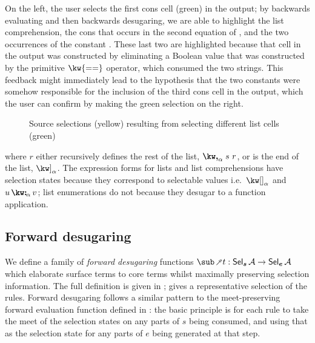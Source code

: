 On the left, the user selects the first cons cell (green) in the output; by backwards evaluating and then backwards desugaring, we are able to highlight the list comprehension, the cons that occurs in the second equation of , and the two occurrences of the constant . These last two are highlighted because that cell in the output was constructed by eliminating a Boolean value that was constructed by the primitive $\kw{==}$ operator, which consumed the two strings. This feedback might immediately lead to the hypothesis that the two constants  were somehow responsible for the inclusion of the third cons cell in the output, which the user can confirm by making the green selection on the right.

\begin{figure}
   \begin{subfigure}{0.48\textwidth}
      \small
      
   \end{subfigure}
   \hfill
   \begin{subfigure}{0.48\textwidth}
      \small
      
      \end{subfigure}
   \caption{Source selections (yellow) resulting from selecting different list cells (green)}
\label{fig:surface-language:example-1}
\end{figure}

where $r$ either recursively defines the rest of the list, $\annListNext{s}{r}{\alpha}$, or is the end of the list, $\annListEnd{\alpha}$. The expression forms for lists and list comprehensions have selection states because they correspond to selectable values i.e.~$\annNil{\alpha}$ and $\annCons{u}{v}{\alpha}$; list enumerations do not because they desugar to a function application.

\subsection{Forward desugaring}

We define a family of \textit{forward desugaring} functions $\desugarFwdF{t}: \Sel{\raw{s}}{A} \to \Sel{\raw{e}}{A}$ which elaborate surface terms to core terms whilst maximally preserving selection information. The full definition is \ifappendices given in  \else \IncludedWithSupplementaryMaterial \fi;  gives a representative selection of the rules. Forward desugaring follows a similar pattern to the meet-preserving forward evaluation function defined in : the basic principle is for each rule to take the meet of the selection states on any parts of $s$ being consumed, and using that as the selection state for any parts of $e$ being generated at that step.

